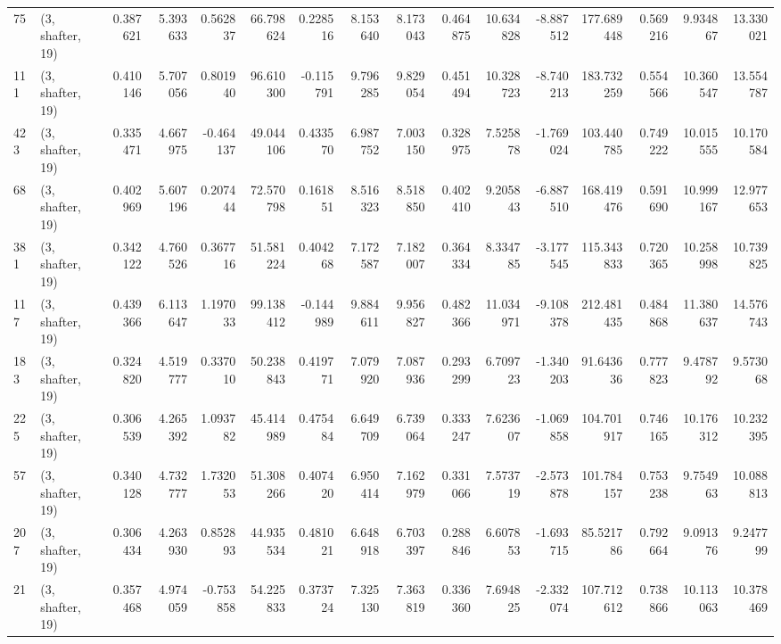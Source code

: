 \begin{tabular}{llrrrrrrrrrrrrrr}
75  &  (3, shafter, 19) &   0.387621 &   5.393633 &   0.562837 &    66.798624 &   0.228516 &   8.153640 &   8.173043 &  0.464875 &  10.634828 &  -8.887512 &   177.689448 &  0.569216 &   9.934867 &  13.330021 \\
111 &  (3, shafter, 19) &   0.410146 &   5.707056 &   0.801940 &    96.610300 &  -0.115791 &   9.796285 &   9.829054 &  0.451494 &  10.328723 &  -8.740213 &   183.732259 &  0.554566 &  10.360547 &  13.554787 \\
423 &  (3, shafter, 19) &   0.335471 &   4.667975 &  -0.464137 &    49.044106 &   0.433570 &   6.987752 &   7.003150 &  0.328975 &   7.525878 &  -1.769024 &   103.440785 &  0.749222 &  10.015555 &  10.170584 \\
68  &  (3, shafter, 19) &   0.402969 &   5.607196 &   0.207444 &    72.570798 &   0.161851 &   8.516323 &   8.518850 &  0.402410 &   9.205843 &  -6.887510 &   168.419476 &  0.591690 &  10.999167 &  12.977653 \\
381 &  (3, shafter, 19) &   0.342122 &   4.760526 &   0.367716 &    51.581224 &   0.404268 &   7.172587 &   7.182007 &  0.364334 &   8.334785 &  -3.177545 &   115.343833 &  0.720365 &  10.258998 &  10.739825 \\
117 &  (3, shafter, 19) &   0.439366 &   6.113647 &   1.197033 &    99.138412 &  -0.144989 &   9.884611 &   9.956827 &  0.482366 &  11.034971 &  -9.108378 &   212.481435 &  0.484868 &  11.380637 &  14.576743 \\
183 &  (3, shafter, 19) &   0.324820 &   4.519777 &   0.337010 &    50.238843 &   0.419771 &   7.079920 &   7.087936 &  0.293299 &   6.709723 &  -1.340203 &    91.643636 &  0.777823 &   9.478792 &   9.573068 \\
225 &  (3, shafter, 19) &   0.306539 &   4.265392 &   1.093782 &    45.414989 &   0.475484 &   6.649709 &   6.739064 &  0.333247 &   7.623607 &  -1.069858 &   104.701917 &  0.746165 &  10.176312 &  10.232395 \\
57  &  (3, shafter, 19) &   0.340128 &   4.732777 &   1.732053 &    51.308266 &   0.407420 &   6.950414 &   7.162979 &  0.331066 &   7.573719 &  -2.573878 &   101.784157 &  0.753238 &   9.754963 &  10.088813 \\
207 &  (3, shafter, 19) &   0.306434 &   4.263930 &   0.852893 &    44.935534 &   0.481021 &   6.648918 &   6.703397 &  0.288846 &   6.607853 &  -1.693715 &    85.521786 &  0.792664 &   9.091376 &   9.247799 \\
21  &  (3, shafter, 19) &   0.357468 &   4.974059 &  -0.753858 &    54.225833 &   0.373724 &   7.325130 &   7.363819 &  0.336360 &   7.694825 &  -2.332074 &   107.712612 &  0.738866 &  10.113063 &  10.378469 \\

\end{tabular}
